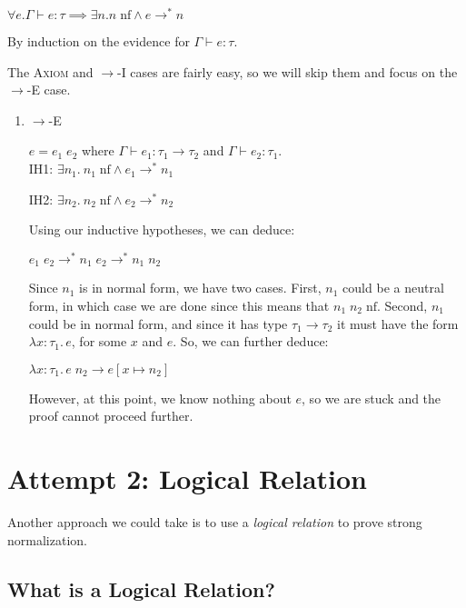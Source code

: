 \documentclass{lecturenotes}
\newcommand{\tabs}[3]{\ensuremath{\lambda #1 \colon #2.\,#3}}
\newcommand{\app}[2]{\ensuremath{#1\;#2}}
\newcommand{\nf}[1]{#1\;\text{nf}}
\newcommand{\proves}{\vdash}
\newenvironment{proof-attempt}{\noindent{\bf Proof Attempt}\hspace*{1em} \textbf{\textcolor{red}{Note: This Proof Fails!}}}{\textbf{\textcolor{red}{Proof Fails.}}}
\begin{document}
\begin{thm}
  \label{thm:strong-norm}
  $\forall e. \Gamma \proves e : \tau \implies \exists n. \nf{n} \land e \to^\ast n$
\end{thm}
\begin{proof-attempt}
  By induction on the evidence for $\Gamma \proves e : \tau$.

  The \textsc{Axiom} and \textsc{$\to$-I} cases are fairly easy, so we will skip them and focus on the \textsc{$\to$-E} case.

  
  \begin{enumerate}
    \item \textsc{$\to$-E}
    
    $e = \app{e_1}{e_2}$ where $\Gamma \proves e_1 : \tau_1 \to \tau_2$ and $\Gamma \proves e_2 : \tau_1$. \\

    IH1: $\exists n_1.~ \nf{n_1} \land e_1 \to^\ast n_1$

    IH2: $\exists n_2.~ \nf{n_2} \land e_2 \to^\ast n_2$

    Using our inductive hypotheses, we can deduce:

    $\app{e_1}{e_2} \to^\ast \app{n_1}{e_2} \to^\ast \app{n_1}{n_2}$

    Since $n_1$ is in normal form, we have two cases.
    First, $n_1$ could be a neutral form, in which case we are done since this means that $\nf{\app{n_1}{n_2}}$.
    Second, $n_1$ could be in normal form, and since it has type $\tau_1 \to \tau_2$ it must have the form $\tabs{x}{\tau_1}{e}$, for some $x$ and $e$.
    So, we can further deduce:

    $\app{\tabs{x}{\tau_1}{e}}{n_2} \to e[x \mapsto n_2]$

    However, at this point, we know nothing about $e$, so we are stuck and the proof cannot proceed further.

  \end{enumerate}

\end{proof-attempt}

\section{Attempt 2: Logical Relation}

Another approach we could take is to use a \emph{logical relation} to prove strong normalization.

\subsection{What is a Logical Relation?}
\end{document}
